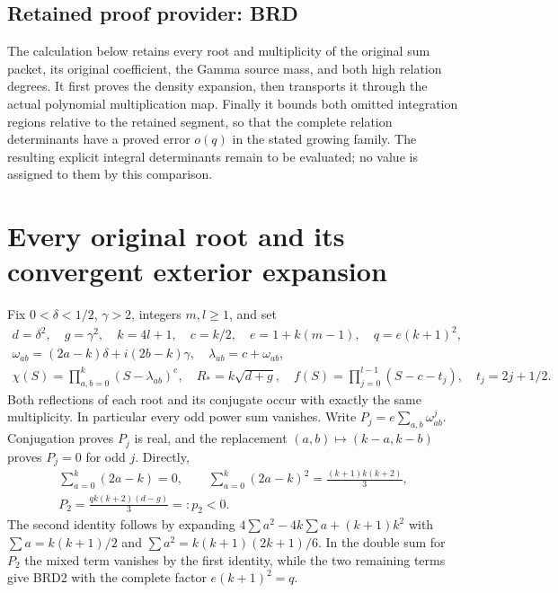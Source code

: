 \documentclass[11pt,a4paper]{article}
\begin{document}

\clearpage
\subsection*{Retained proof provider: BRD}

The calculation below retains every root and multiplicity of the
original sum packet, its original coefficient, the Gamma source mass,
and both high relation degrees. It first proves the density expansion,
then transports it through the actual polynomial multiplication map.
Finally it bounds both omitted integration regions relative to the
retained segment, so that the complete relation determinants have a
proved error $o(q)$ in the stated growing family. The resulting
explicit integral determinants remain to be evaluated; no value is
assigned to them by this comparison.

\section{Every original root and its convergent exterior expansion}

Fix $0<\delta<1/2$, $\gamma>2$, integers $m,l\geq1$, and set
\[
\begin{gathered}
 d=\delta^2,\quad g=\gamma^2,\quad k=4l+1,\quad
 c=k/2,\quad e=1+k(m-1),\quad q=e(k+1)^2,\\
 \omega_{ab}=(2a-k)\delta+i(2b-k)\gamma,
 \quad \lambda_{ab}=c+\omega_{ab},\\
 \chi(S)=\prod_{a,b=0}^k(S-\lambda_{ab})^e,
 \quad R_*=k\sqrt{d+g},\quad
 f(S)=\prod_{j=0}^{l-1}(S-c-t_j),\quad t_j=2j+1/2.
\end{gathered}\tag{BRD1}
\]
Both reflections of each root and its conjugate occur with exactly
the same multiplicity. In particular every odd power sum vanishes.
Write $P_j=e\sum_{a,b}\omega_{ab}^j$. Conjugation proves $P_j$
is real, and the replacement $(a,b)\mapsto(k-a,k-b)$ proves
$P_j=0$ for odd $j$. Directly,
\[
\begin{gathered}
 \sum_{a=0}^k(2a-k)=0,\qquad
 \sum_{a=0}^k(2a-k)^2=\frac{(k+1)k(k+2)}3,\\
 P_2=\frac{qk(k+2)(d-g)}3=:p_2<0.
\end{gathered}\tag{BRD2}
\]
The second identity follows by expanding $4\sum a^2-4k\sum a+
(k+1)k^2$ with $\sum a=k(k+1)/2$ and
$\sum a^2=k(k+1)(2k+1)/6$. In the double sum for $P_2$ the
mixed term vanishes by the first identity, while the two remaining
terms give BRD2 with the complete factor $e(k+1)^2=q$.
\end{document}
